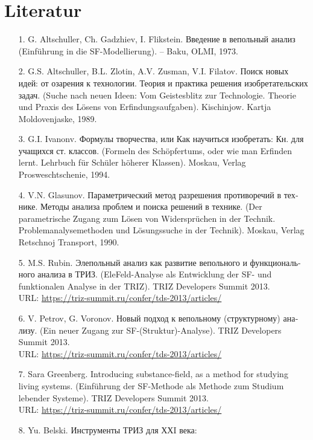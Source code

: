 \documentclass[11pt,a4paper]{article}
\begin{document}
\section*{Literatur}
\begin{itemize}
\item[1.] G. Altschuller, Ch. Gadzhiev, I. Flikstein.
  \foreignlanguage{russian}{Введение в вепольный анализ} (Einführung in die
  SF-Modellierung). – Baku, OLMI, 1973.
\item[2.] G.S. Altschuller, B.L. Zlotin, A.V. Zusman, V.I. Filatov.
  \foreignlanguage{russian}{Поиск новых идей: от озарения к технологии. Теория
    и практика решения изобретательских задач.}  (Suche nach neuen Ideen: Vom
  Geistesblitz zur Technologie. Theorie und Praxis des Lösens von
  Erfindungsaufgaben). Kischinjow. Kartja Moldovenjaske, 1989.
\item[3.] G.I. Ivanonv. \foreignlanguage{russian}{Формулы творчества, или Как
  научиться изобретать: Кн.  для учащихся ст. классов.} (Formeln des
  Schöpfertums, oder wie man Erfinden lernt. Lehrbuch für Schüler höherer
  Klassen). Moskau, Verlag Prosweschtschenie, 1994.
\item[4.] V.N. Glasunov. \foreignlanguage{russian}{Параметрический метод
  разрешения противоречий в технике. Методы анализа проблем и поиска решений в
  технике.} (Der parametrische Zugang zum Lösen von Widersprüchen in der
  Technik.  Problemanalysemethoden und Lösungssuche in der Technik). Moskau,
  Verlag Retschnoj Transport, 1990.
\item[5.] M.S. Rubin. \foreignlanguage{russian}{Элепольный анализ как развитие
  вепольного и функционального анализа в ТРИЗ}. (EleFeld-Analyse als
  Entwicklung der SF- und funktionalen Analyse in der TRIZ). TRIZ Developers
  Summit 2013.\\  URL: \url{https://triz-summit.ru/confer/tds-2013/articles/}
\item[6.] V. Petrov, G. Voronov. \foreignlanguage{russian}{Новый подход к
  вепольному (структурному) анализу}. (Ein neuer Zugang zur
  SF-(Struktur)-Analyse).  TRIZ Developers Summit 2013. \\ URL:
  \url{https://triz-summit.ru/confer/tds-2013/articles/}
\item[7.] Sara Greenberg. Introducing substance-field, as a method for
  studying living systems. (Einführung der SF-Methode als Methode zum Studium
  lebender Systeme). TRIZ Developers Summit 2013. \\ URL:
  \url{https://triz-summit.ru/confer/tds-2013/articles/}
\item[8.] Yu. Belski. \foreignlanguage{russian}{Инструменты ТРИЗ для ХХI века:
}
\end{itemize}
\end{document}
